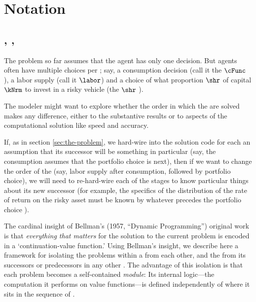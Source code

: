 
\hypertarget{notation}{}
\section{Notation}\label{sec:notation}

\subsection{\Intervals, \Stgs, \Prchs}

The problem so far assumes that the agent has only one decision.  But agents often have multiple choices per {\interval}; say, a consumption decision (call it the $\cFunc$ {\stg}), a labor supply {\stg} (call it $\labor$) and a choice of what proportion $\shr$ of capital $\kNrm$ to invest in a risky vehicle (the $\shr$ {\stg}).

The modeler might want to explore whether the order in which the {\stgs} are solved makes any difference, either to the substantive results or to aspects of the computational solution like speed and accuracy.

If, as in section \ref{sec:the-problem}, we hard-wire into the solution code for each {\stg} an assumption that its successor {\stg} will be something in particular (say, the consumption {\stg} assumes that the portfolio choice is next), then if we want to change the order of the {\stgs} (say, labor supply after consumption, followed by portfolio choice), we will need to re-hard-wire each of the stages to know particular things about its new successor (for example, the specifics of the distribution of the rate of return on the risky asset must be known by whatever {\stg} precedes the portfolio choice {\stg}).

The cardinal insight of Bellman's (1957, ``Dynamic Programming'') original work is that \emph{everything that matters} for the solution to the current problem is encoded in a `continuation-value function.' %
Using Bellman's insight, we describe here a framework for isolating the {\stg} problems within a {\interval} from each other, and the {\interval} from its successors or predecessors in any other {\interval}.  The advantage of this isolation is that each {\stg} problem becomes a self-contained \textit{module}: Its internal logic---the computation it performs on value functions---is defined independently of where it sits in the sequence of {\stgs}.

